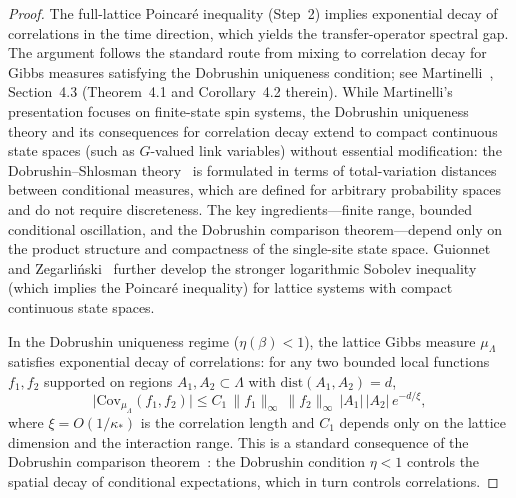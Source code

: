 \documentclass[12pt,a4paper]{article}
\theoremstyle{definition}
\theoremstyle{plain}
\theoremstyle{remark}
\begin{document}
\begin{proof}
The full-lattice Poincar\'e inequality (Step~2) implies exponential decay of correlations in the time direction, which yields the transfer-operator spectral gap. The argument follows the standard route from mixing to correlation decay for Gibbs measures satisfying the Dobrushin uniqueness condition; see Martinelli~\cite{Martinelli1999}, Section~4.3 (Theorem~4.1 and Corollary~4.2 therein). While Martinelli's presentation focuses on finite-state spin systems, the Dobrushin uniqueness theory and its consequences for correlation decay extend to compact continuous state spaces (such as $G$-valued link variables) without essential modification: the Dobrushin--Shlosman theory~\cite{DobrushinShlosman1985} is formulated in terms of total-variation distances between conditional measures, which are defined for arbitrary probability spaces and do not require discreteness. The key ingredients---finite range, bounded conditional oscillation, and the Dobrushin comparison theorem---depend only on the product structure and compactness of the single-site state space. Guionnet and Zegar\-li\'nski~\cite{GuionnetZegarlinski2003} further develop the stronger logarithmic Sobolev inequality (which implies the Poincar\'e inequality) for lattice systems with compact continuous state spaces.

In the Dobrushin uniqueness regime ($\eta(\beta) < 1$), the lattice Gibbs measure $\mu_\Lambda$ satisfies exponential decay of correlations: for any two bounded local functions $f_1, f_2$ supported on regions $A_1, A_2 \subset \Lambda$ with $\mathrm{dist}(A_1, A_2) = d$,
\begin{equation}\label{eq:corr-decay-martinelli}
    \bigl|\mathrm{Cov}_{\mu_\Lambda}(f_1, f_2)\bigr| \leq C_1\,\|f_1\|_\infty\,\|f_2\|_\infty\,|A_1|\,|A_2|\,e^{-d/\xi},
\end{equation}
where $\xi = O(1/\kappa_*)$ is the correlation length and $C_1$ depends only on the lattice dimension and the interaction range. This is a standard consequence of the Dobrushin comparison theorem~\cite{DobrushinShlosman1985, Martinelli1999, GuionnetZegarlinski2003}: the Dobrushin condition $\eta < 1$ controls the spatial decay of conditional expectations, which in turn controls correlations.


\end{proof}
\end{document}
